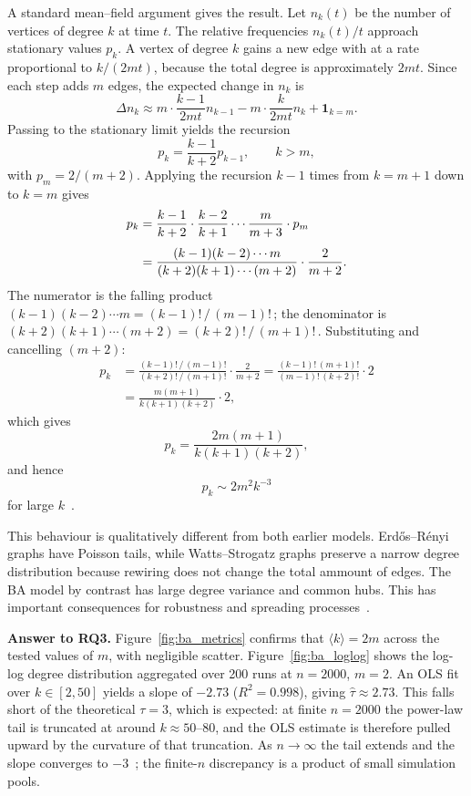 \documentclass[12pt, a4paper]{report}
\theoremstyle{definition}
\theoremstyle{plain}
\theoremstyle{remark}
\begin{document}
A standard mean--field argument gives the result. Let
$n_k(t)$ be the number of vertices of degree $k$ at time
$t$. The relative frequencies $n_k(t)/t$ approach stationary
values $p_k$. A vertex of degree $k$ gains a new edge with
at a rate proportional to $k/(2mt)$, because the total degree
is approximately $2mt$. Since each step adds $m$ edges,
the expected change in $n_k$ is
\[
\Delta n_k
\approx
m \cdot \frac{k-1}{2mt} n_{k-1}
-
m \cdot \frac{k}{2mt} n_k
+
\mathbf{1}_{k=m}.
\]
Passing to the stationary limit yields the recursion
\[
p_k = \frac{k-1}{k+2} p_{k-1},
\qquad k>m,
\]
with $p_m = 2/(m+2)$. Applying the recursion
$k-1$ times from $k = m+1$ down to $k = m$ gives
\begin{align}
p_k
  &= \frac{k-1}{k+2}\cdot\frac{k-2}{k+1}\cdots\frac{m}{m+3}
     \cdot p_m \notag\\[4pt]
  &= \frac{(k-1)(k-2)\cdots m}{(k+2)(k+1)\cdots(m+2)}
     \cdot \frac{2}{m+2}. \label{eq:ba_telescope}
\end{align}
The numerator is the falling product
$(k-1)(k-2)\cdots m = (k-1)!\,/\,(m-1)!$\,; the
denominator is $(k+2)(k+1)\cdots(m+2) = (k+2)!\,/\,(m+1)!$\,.
Substituting and cancelling $(m+2)$:
\begin{align*}
p_k
  &= \frac{(k-1)!\,/\,(m-1)!}
          {(k+2)!\,/\,(m+1)!}
     \cdot \frac{2}{m+2}
  = \frac{(k-1)!\,(m+1)!}{(m-1)!\,(k+2)!}\cdot 2 \\[4pt]
  &= \frac{m(m+1)}{k(k+1)(k+2)}\cdot 2,
\end{align*}
which gives
\[
p_k = \frac{2m(m+1)}{k(k+1)(k+2)},
\]
and hence
\[
p_k \sim 2m^2 k^{-3}
\]
for large $k$~\cite[Sec.~8.4]{hofstad2017}.

This behaviour is qualitatively different from both earlier
models. Erdős--Rényi graphs have Poisson tails, while
Watts--Strogatz graphs preserve a narrow degree distribution
because rewiring does not change the total ammount of edges.
The BA model by contrast has large degree variance
and common hubs. This has important consequences for
robustness and spreading processes~\cite{albert2002}.

\textbf{Answer to RQ3.} Figure~\ref{fig:ba_metrics}
confirms that $\langle k \rangle = 2m$ across the tested
values of $m$, with negligible scatter.
Figure~\ref{fig:ba_loglog} shows the log-log degree
distribution aggregated over 200 runs at $n=2000$,
$m=2$.  An OLS fit over $k \in [2, 50]$ yields a slope of
$-2.73$ ($R^2 = 0.998$), giving $\hat\tau \approx 2.73$.
This falls short of the theoretical $\tau = 3$, which is
expected: at finite $n = 2000$ the power-law tail is
truncated at around $k \approx 50$--$80$, and the OLS
estimate is therefore pulled upward by the curvature of
that truncation.  As $n \to \infty$ the tail extends and
the slope converges to $-3$~\cite[Sec.~8.4]{hofstad2017};
the finite-$n$ discrepancy is a product of small simulation pools.
\end{document}
